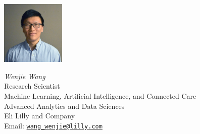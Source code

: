 \documentclass{report}
\newcommand{\email}[1]{\href{mailto:#1}{\normalfont\texttt{#1}}}
\begin{document}
\medskip

\noindent
\begin{minipage}[b]{1.2in}\centering
  \includegraphics[width=1.2in, trim={{0.08\wd0} {0.08\ht0} {0.08\wd0}
    {0.08\ht0}}, clip=true]{WenjieWang}\\
\end{minipage}
\hspace{0.2cm}
\begin{minipage}[b]{2.4in}
\begin{flushright}
  \emph{Wenjie Wang}\\
  Research Scientist\\
  Machine Learning, Artificial Intelligence, and Connected Care\\
  Advanced Analytics and Data Sciences\\
  Eli Lilly and Company\\
  Email: \email{wang\_wenjie@lilly.com}
\end{flushright}
\end{minipage}
\end{document}
